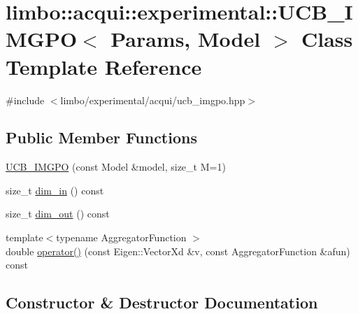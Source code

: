 \hypertarget{classlimbo_1_1acqui_1_1experimental_1_1_u_c_b___i_m_g_p_o}{}\section{limbo\+:\+:acqui\+:\+:experimental\+:\+:U\+C\+B\+\_\+\+I\+M\+G\+P\+O$<$ Params, Model $>$ Class Template Reference}
\label{classlimbo_1_1acqui_1_1experimental_1_1_u_c_b___i_m_g_p_o}


{\ttfamily \#include $<$limbo/experimental/acqui/ucb\+\_\+imgpo.\+hpp$>$}

\subsection*{Public Member Functions}
\begin{DoxyCompactItemize}
\item 
\hyperlink{classlimbo_1_1acqui_1_1experimental_1_1_u_c_b___i_m_g_p_o_a13c9d89758fe241c051fafe06337fd1e}{U\+C\+B\+\_\+\+I\+M\+G\+P\+O} (const Model \&model, size\+\_\+t M=1)
\item 
size\+\_\+t \hyperlink{classlimbo_1_1acqui_1_1experimental_1_1_u_c_b___i_m_g_p_o_ac773917d0802053632cd37e7885fe282}{dim\+\_\+in} () const 
\item 
size\+\_\+t \hyperlink{classlimbo_1_1acqui_1_1experimental_1_1_u_c_b___i_m_g_p_o_ad6b61ac04acf5a268eb7fef4a879bc31}{dim\+\_\+out} () const 
\item 
{\footnotesize template$<$typename Aggregator\+Function $>$ }\\double \hyperlink{classlimbo_1_1acqui_1_1experimental_1_1_u_c_b___i_m_g_p_o_a4f0d0671883e2d3a9a501e95c091098f}{operator()} (const Eigen\+::\+Vector\+Xd \&v, const Aggregator\+Function \&afun) const 
\end{DoxyCompactItemize}


\subsection{Constructor \& Destructor Documentation}
\hypertarget{classlimbo_1_1acqui_1_1experimental_1_1_u_c_b___i_m_g_p_o_a13c9d89758fe241c051fafe06337fd1e}{}
